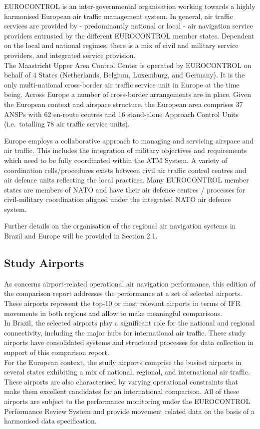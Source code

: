 \documentclass[
  a4paper,
  DIV=11,
  numbers=noendperiod]{scrreport}
\begin{document}
EUROCONTROL is an inter-governmental organisation working towards a
highly harmonised European air traffic management system. In general,
air traffic services are provided by - predominantly national or local -
air navigation service providers entrusted by the different EUROCONTROL
member states. Dependent on the local and national regimes, there is a
mix of civil and military service providers, and integrated service
provision.\\
The Maastricht Upper Area Control Center is operated by EUROCONTROL on
behalf of 4 States (Netherlands, Belgium, Luxemburg, and Germany). It is
the only multi-national cross-border air traffic service unit in Europe
at the time being. Across Europe a number of cross-border arrangements
are in place. Given the European context and airspace structure, the
European area comprises 37 ANSPs with 62 en-route centres and 16
stand-alone Approach Control Units (i.e.~totalling 78 air traffic
service units).

Europe employs a collaborative approach to managing and servicing
airspace and air traffic. This includes the integration of military
objectives and requirements which need to be fully coordinated within
the ATM System. A variety of coordination cells/procedures exists
between civil air traffic control centres and air defence units
reflecting the local practices. Many EUROCONTROL member states are
members of NATO and have their air defence centres / processes for
civil-military coordination aligned under the integrated NATO air
defence system.

Further details on the organisation of the regional air navigation
systems in Brazil and Europe will be provided in Section 2.1.

\subsection{Study Airports}\label{study-airports}

As concerns airport-related operational air navigation performance, this
edition of the comparison report addresses the performance at a set of
selected airports. These airports represent the top-10 or most relevant
airports in terms of IFR movements in both regions and allow to make
meaningful comparisons.\\
In Brazil, the selected airports play a significant role for the
national and regional connectivity, including the major hubs for
international air traffic. These study airports have consolidated
systems and structured processes for data collection in support of this
comparison report.\\
For the European context, the study airports comprise the busiest
airports in several states exhibiting a mix of national, regional, and
international air traffic. These airports are also characterised by
varying operational constraints that make them excellent candidates for
an international comparison. All of these airports are subject to the
performance monitoring under the EUROCONTROL Performance Review System
and provide movement related data on the basis of a harmonised data
specification.
\end{document}
